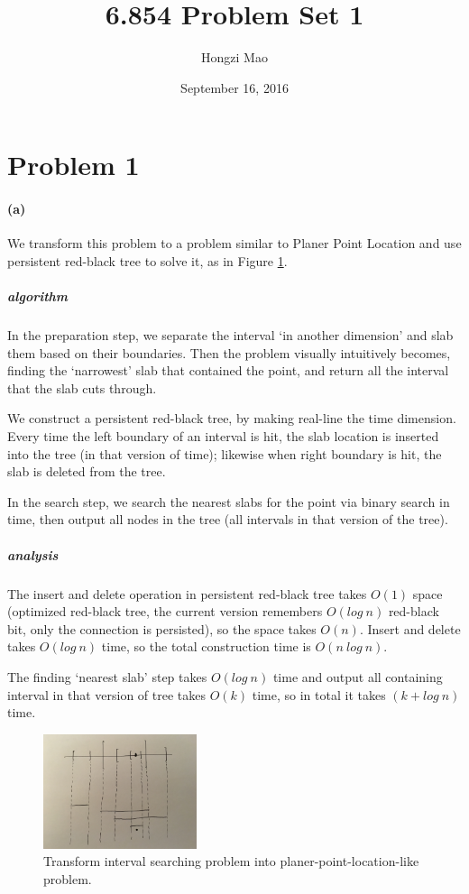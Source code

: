 \documentclass[10pt,letter]{article}
\begin{document}
\title{6.854 Problem Set 1}

\author{Hongzi Mao}

\date{September 16, 2016}
 
\maketitle 

\section*{Problem 1}
\paragraph{(a)} We transform this problem to a problem similar to Planer Point Location and use persistent red-black tree to solve it, as in Figure \ref{fig:1-1}. 

\subparagraph{algorithm}In the preparation step, we separate the interval `in another dimension' and slab them based on their boundaries. Then the problem visually intuitively becomes, finding the `narrowest' slab that contained the point, and return all the interval that the slab cuts through.

We construct a persistent red-black tree, by making real-line the time dimension. Every time the left boundary of an interval is hit, the slab location is inserted into the tree (in that version of time); likewise when right boundary is hit, the slab is deleted from the tree. 

In the search step, we search the nearest slabs for the point via binary search in time, then output all nodes in the tree (all intervals in that version of the tree).
\subparagraph{analysis} The insert and delete operation in persistent red-black tree takes $O(1)$ space (optimized red-black tree, the current version remembers $O(log\:n)$ red-black bit, only the connection is persisted), so the space takes $O(n)$. Insert and delete takes $O(log\:n)$ time, so the total construction time is $O(n\:log\:n)$.

The finding `nearest slab' step takes $O(log\:n)$ time and output all containing interval in that version of tree takes $O(k)$ time, so in total it takes $(k + log\:n)$ time.
\begin{figure}
	\centering
	\includegraphics[width=0.4\textwidth]{1-1.jpg}
	\caption{Transform interval searching problem into planer-point-location-like problem.} \label{fig:1-1}
\end{figure}
\end{document}
